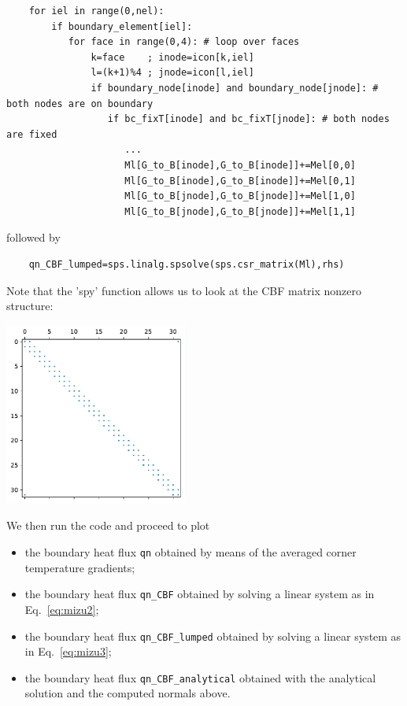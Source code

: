\begin{lstlisting}
    for iel in range(0,nel):
        if boundary_element[iel]:
           for face in range(0,4): # loop over faces
               k=face    ; inode=icon[k,iel]
               l=(k+1)%4 ; jnode=icon[l,iel]
               if boundary_node[inode] and boundary_node[jnode]: # both nodes are on boundary
                  if bc_fixT[inode] and bc_fixT[jnode]: # both nodes are fixed
                     ...
                     Ml[G_to_B[inode],G_to_B[inode]]+=Mel[0,0]
                     Ml[G_to_B[inode],G_to_B[inode]]+=Mel[0,1]
                     Ml[G_to_B[jnode],G_to_B[jnode]]+=Mel[1,0]
                     Ml[G_to_B[jnode],G_to_B[jnode]]+=Mel[1,1]
\end{lstlisting}
followed by 
\begin{lstlisting}
    qn_CBF_lumped=sps.linalg.spsolve(sps.csr_matrix(Ml),rhs)
\end{lstlisting}

Note that the 'spy' function allows us to look at the CBF matrix nonzero structure:
\begin{center}
\includegraphics[width=6cm]{python_codes/fieldstone_173/results/exp1/matrix.pdf}
\end{center}


We then run the code and proceed to plot
\begin{itemize}
\item the boundary heat flux \lstinline{qn} obtained by means of the averaged corner 
temperature gradients;
\item the boundary heat flux \lstinline{qn_CBF} obtained by solving a linear system as in Eq.~\eqref{eq:mizu2};
\item the boundary heat flux \lstinline{qn_CBF_lumped} obtained by solving a linear system as in Eq.~\eqref{eq:mizu3};
\item the boundary heat flux \lstinline{qn_CBF_analytical} obtained with the analytical solution and the 
computed normals above. 
\end{itemize}

